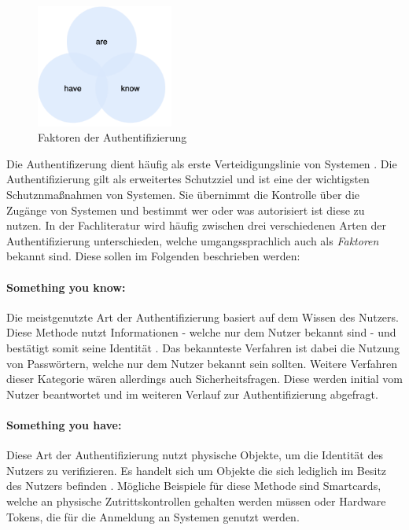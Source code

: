 \begin{figure}[h]
	\centering 
	\includegraphics[width=0.4\textwidth]{img/abbildungen/factors.png}
	\captionsetup{format=hang}
	\caption{Faktoren der Authentifizierung}
\end{figure}

Die Authentifizerung dient häufig als erste Verteidigungslinie von Systemen \cite{boonkrong2012security}. Die Authentifizierung gilt als erweitertes Schutzziel und ist eine der wichtigsten Schutznmaßnahmen von Systemen. Sie übernimmt die Kontrolle über die Zugänge von Systemen und bestimmt wer oder was autorisiert ist diese zu nutzen. In der Fachliteratur wird häufig zwischen drei verschiedenen Arten der Authentifizierung unterschieden, welche umgangssprachlich auch als \textit{Faktoren} bekannt sind. Diese sollen im Folgenden beschrieben werden:

\paragraph*{Something you know:}
Die meistgenutzte Art der Authentifizierung basiert auf dem Wissen des Nutzers. Diese Methode nutzt Informationen - welche nur dem Nutzer bekannt sind - und bestätigt somit seine Identität \cite{boonkrong2012security}. Das bekannteste Verfahren ist dabei die Nutzung von Passwörtern, welche nur dem Nutzer bekannt sein sollten. Weitere Verfahren dieser Kategorie wären allerdings auch Sicherheitsfragen. Diese werden initial vom Nutzer beantwortet und im weiteren Verlauf zur Authentifizierung abgefragt.

\paragraph*{Something you have:}
Diese Art der Authentifizierung nutzt physische Objekte, um die Identität des Nutzers zu verifizieren. Es handelt sich um Objekte die sich lediglich im Besitz des Nutzers befinden \cite{boonkrong2012security}. Mögliche Beispiele für diese Methode sind Smartcards, welche an physische Zutrittskontrollen gehalten werden müssen oder Hardware Tokens, die für die Anmeldung an Systemen genutzt werden.

